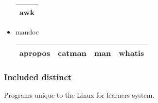 \begin{itemize}
        \begin{center}
            \begin{tabular}{|c|}
                \hline   
                awk \\
                \hline
            \end{tabular}
        \end{center}
    \item mandoc
        \begin{center}
            \begin{tabular}{|c|c|c|c|}
                \hline
                apropos & catman & man & whatis \\
                \hline
            \end{tabular}
        \end{center}
\end{itemize}

\newpage

\subsubsection{Included distinct}

Programs unique to the Linux for learners system.

